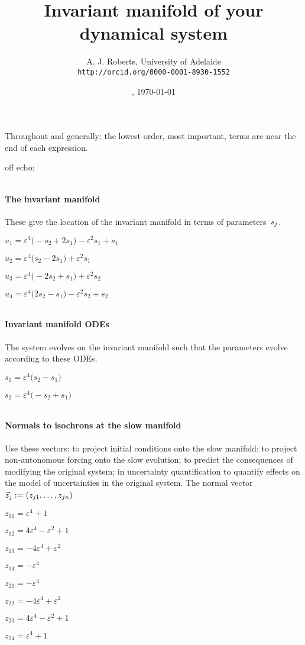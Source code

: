 \documentclass[11pt,a5paper]{article}
\title{Invariant manifold of your dynamical system}
\author{A. J. Roberts, University of Adelaide\\
\texttt{http://orcid.org/0000-0001-8930-1552}}
\date{\now, \today}
\def\eps{\varepsilon}
\begin{document}
\maketitle
Throughout and generally: the lowest order, most
important, terms are near the end of each expression.


off echo;


\(
\)
\paragraph{The invariant manifold}
These give the location of the invariant manifold in
terms of parameters~\(s\sb j\).
\(
\)\par

\(u_{1}=\eps^{4} \big(-s_{2}+2 s_{1}\big)-\eps^{2} s_{1}+s_{1}
\)\par

\(u_{2}=\eps^{4} \big(s_{2}-2 s_{1}\big)+\eps^{2} s_{1}
\)\par

\(u_{3}=\eps^{4} \big(-2 s_{2}+s_{1}\big)+\eps^{2} s_{2}
\)\par

\(u_{4}=\eps^{4} \big(2 s_{2}-s_{1}\big)-\eps^{2} s_{2}+s_{2}
\)\par

\(
\)
\paragraph{Invariant manifold ODEs}
The system evolves on the invariant manifold such
that the parameters evolve according to these ODEs.
\(
\)\par

\(\dot s_{1}=\eps^{4} \big(s_{2}-s_{1}\big)
\)\par

\(\dot s_{2}=\eps^{4} \big(-s_{2}+s_{1}\big)
\)\par

\(
\)
\paragraph{Normals to isochrons at the slow manifold}
Use these vectors: to project initial conditions
onto the slow manifold; to project non-autonomous
forcing onto the slow evolution; to predict the
consequences of modifying the original system; in
uncertainty quantification to quantify effects on
the model of uncertainties in the original system.
The normal vector \(\vec z\sb j:=(z\sb{j1},\ldots,z\sb{jn})\)
\(
\)\par

\(z_{11}=\eps^{4}+1
\)\par

\(z_{12}=4 \eps^{4}-\eps^{2}+1
\)\par

\(z_{13}=-4 \eps^{4}+\eps^{2}
\)\par

\(z_{14}=-\eps^{4}
\)\par

\(z_{21}=-\eps^{4}
\)\par

\(z_{22}=-4 \eps^{4}+\eps^{2}
\)\par

\(z_{23}=4 \eps^{4}-\eps^{2}+1
\)\par

\(z_{24}=\eps^{4}+1
\)\par
\end{document}
